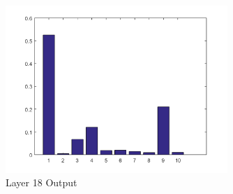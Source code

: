 \documentclass[11pt,english]{article}
\begin{document}
\begin{appendices}
\begin{figure}[h!]
  \caption{Layer 18 Output}
  \centering
    \includegraphics[width=0.75\textwidth]{layer/18}
\end{figure}


\end{appendices}
\end{document}
